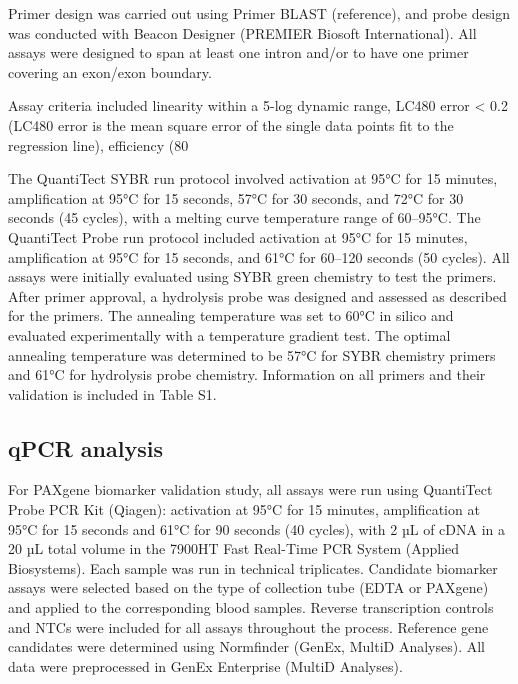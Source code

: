 \documentclass[fleqn,10pt]{wlscirep}
\begin{document}
Primer design was carried out using Primer BLAST (reference), and probe design was conducted with Beacon Designer (PREMIER Biosoft International). All assays were designed to span at least one intron and/or to have one primer covering an exon/exon boundary. 

Assay criteria included linearity within a 5-log dynamic range, LC480 error < 0.2 (LC480 error is the mean square error of the single data points fit to the regression line), efficiency (80%

The QuantiTect SYBR run protocol involved activation at 95°C for 15 minutes, amplification at 95°C for 15 seconds, 57°C for 30 seconds, and 72°C for 30 seconds (45 cycles), with a melting curve temperature range of 60–95°C. The QuantiTect Probe run protocol included activation at 95°C for 15 minutes, amplification at 95°C for 15 seconds, and 61°C for 60–120 seconds (50 cycles). All assays were initially evaluated using SYBR green chemistry to test the primers. After primer approval, a hydrolysis probe was designed and assessed as described for the primers. The annealing temperature was set to 60°C in silico and evaluated experimentally with a temperature gradient test. The optimal annealing temperature was determined to be 57°C for SYBR chemistry primers and 61°C for hydrolysis probe chemistry. Information on all primers and their validation is included in Table S1.

\subsection*{qPCR analysis}
For PAXgene biomarker validation study, all assays were run using QuantiTect Probe PCR Kit (Qiagen): activation at 95°C for 15 minutes, amplification at 95°C for 15 seconds and 61°C for 90 seconds (40 cycles), with 2 µL of cDNA in a 20 µL total volume in the 7900HT Fast Real-Time PCR System (Applied Biosystems). Each sample was run in technical triplicates. Candidate biomarker assays were selected based on the type of collection tube (EDTA or PAXgene) and applied to the corresponding blood samples. Reverse transcription controls and NTCs were included for all assays throughout the process. Reference gene candidates were determined using Normfinder (GenEx, MultiD Analyses). All data were preprocessed in GenEx Enterprise (MultiD Analyses).
\end{document}
